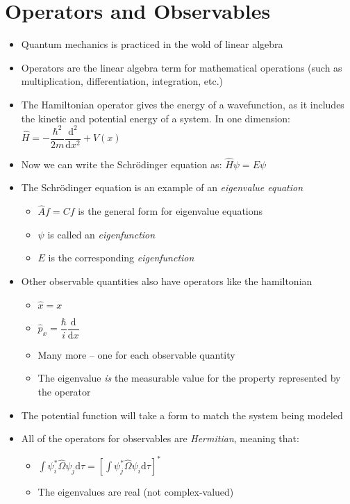 \documentclass[12pt, openany, letterpaper]{memoir}
\begin{document}
\section{Operators and Observables}
\begin{itemize}
	\item Quantum mechanics is practiced in the wold of linear algebra
	\item Operators are the linear algebra term for mathematical operations (such as multiplication, differentiation, integration, etc.)
	\item The Hamiltonian operator gives the energy of a wavefunction, as it includes the kinetic and potential energy of a system. In one dimension: $\hat{H} = -\dfrac{\hbar^2}{2m}\dfrac{\mathrm{d}^2}{\mathrm{d}x^2}+V(x)$
	\item Now we can write the Schr\"odinger equation as: $\hat{H}\psi=E\psi$
	\item The Schr\"odinger equation is an example of an \emph{eigenvalue equation}
	\begin{itemize}
		\item $\hat{A}f=Cf$ is the general form for eigenvalue equations
		\item $\psi$ is called an \emph{eigenfunction}
		\item $E$ is the corresponding \emph{eigenfunction}
	\end{itemize}
	\item Other observable quantities also have operators like the hamiltonian
	\begin{itemize}
		\item $\hat{x} = x$
		\item $\hat{p}_x = \dfrac{\hbar}{i}\dfrac{\mathrm{d}}{\mathrm{d}x}$
		\item Many more -- one for each observable quantity
		\item The eigenvalue \emph{is} the measurable value for the property represented by the operator
	\end{itemize}
	\item The potential function will take a form to match the system being modeled
	\item All of the operators for observables are \emph{Hermitian}, meaning that:
	\begin{itemize}
		\item $\displaystyle\int\psi_i^*\hat{\Omega}\psi_j\mathrm{d}\tau = \left[\displaystyle\int\psi_j^*\hat{\Omega}\psi_i\mathrm{d}\tau\right]^*$
		\item The eigenvalues are real (not complex-valued)

\end{itemize}
\end{itemize}
\end{document}
